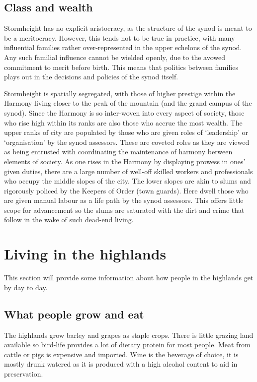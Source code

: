 \documentclass[a4paper,11pt,oneside]{book}
\begin{document}
\subsection{Class and wealth}
Stormheight has no explicit aristocracy, as the structure of the synod is meant to be a meritocracy. However, this tends not to be true in practice, with many influential families rather over-represented in the upper echelons of the synod. Any such familial influence cannot be wielded openly, due to the avowed commitment to merit before birth. This means that politics between families plays out in the decisions and policies of the synod itself. 

Stormheight is spatially segregated, with those of higher prestige within the Harmony living closer to the peak of the mountain (and the grand campus of the synod). Since the Harmony is so inter-woven into every aspect of society, those who rise high within its ranks are also those who accrue the most wealth. The upper ranks of city are populated by those who are given roles of `leadership' or `organisation' by the synod assessors. These are coveted roles as they are viewed as being entrusted with coordinating the maintenance of harmony between elements of society. As one rises in the Harmony by displaying prowess in ones' given duties, there are a large number of well-off skilled workers and professionals who occupy the middle slopes of the city. The lower slopes are akin to slums and rigorously policed by the Keepers of Order (town guards). Here dwell those who are given manual labour as a life path by the synod assessors. This offers little scope for advancement so the slums are saturated with the dirt and crime that follow in the wake of such dead-end living.      

\section{Living in the highlands}
This section will provide some information about how people in the highlands get by day to day.

\subsection{What people grow and eat}
The highlands grow barley and grapes as staple crops. There is little grazing land available so bird-life provides a lot of dietary protein for most people. Meat from cattle or pigs is expensive and imported. Wine is the beverage of choice, it is mostly drunk watered as it is produced with a high alcohol content to aid in preservation. 
\end{document}
